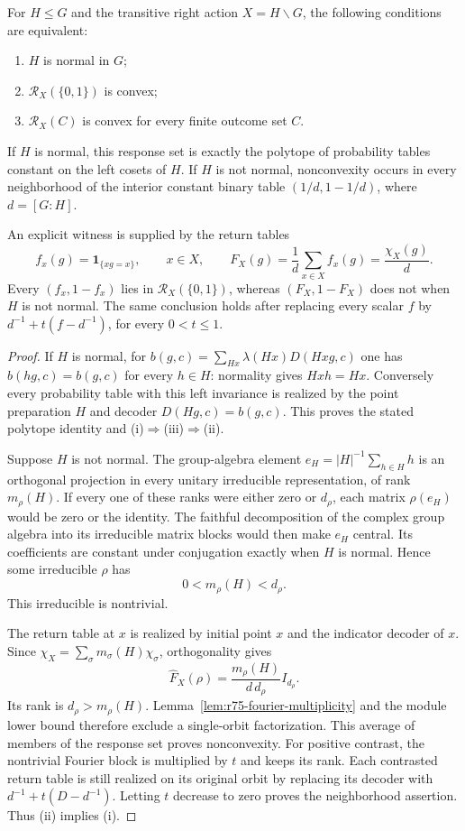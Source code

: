 \begin{theorem}
\label{thm:r75-normality-convexity}
For $H\le G$ and the transitive right action $X=H\backslash G$, the
following conditions are equivalent:
\begin{enumerate}
\item $H$ is normal in $G$;
\item $\mathcal R_X(\{0,1\})$ is convex;
\item $\mathcal R_X(C)$ is convex for every finite outcome set $C$.
\end{enumerate}
If $H$ is normal, this response set is exactly the polytope of
probability tables constant on the left cosets of $H$. If $H$ is not
normal, nonconvexity occurs in every neighborhood of the interior
constant binary table $(1/d,1-1/d)$, where $d=[G:H]$.

An explicit witness is supplied by the return tables
\[
 f_x(g)=\mathbf1_{\{xg=x\}},\qquad x\in X,
 \qquad
 F_X(g)=\frac1d\sum_{x\in X}f_x(g)=\frac{\chi_X(g)}d.
\]
Every $(f_x,1-f_x)$ lies in $\mathcal R_X(\{0,1\})$, whereas
$(F_X,1-F_X)$ does not when $H$ is not normal. The same conclusion
holds after replacing every scalar $f$ by $d^{-1}+t(f-d^{-1})$, for
every $0<t\le1$.
\end{theorem}
\begin{proof}
If $H$ is normal, for
$b(g,c)=\sum_{Hx}\lambda(Hx)D(Hxg,c)$ one has
$b(hg,c)=b(g,c)$ for every $h\in H$: normality gives $Hxh=Hx$.
Conversely every probability table with this left invariance is
realized by the point preparation $H$ and decoder
$D(Hg,c)=b(g,c)$. This proves the stated polytope identity and
(i)$\Rightarrow$(iii)$\Rightarrow$(ii).

Suppose $H$ is not normal. The group-algebra element
$e_H=|H|^{-1}\sum_{h\in H}h$ is an orthogonal projection in every
unitary irreducible representation, of rank $m_\rho(H)$. If every one
of these ranks were either zero or $d_\rho$, each matrix $\rho(e_H)$
would be zero or the identity. The faithful decomposition of the
complex group algebra into its irreducible matrix blocks would then
make $e_H$ central. Its coefficients are constant under conjugation
exactly when $H$ is normal. Hence some irreducible $\rho$ has
\[
 0<m_\rho(H)<d_\rho.
\]
This irreducible is nontrivial.

The return table at $x$ is realized by initial point $x$ and the
indicator decoder of $x$. Since
$\chi_X=\sum_\sigma m_\sigma(H)\chi_\sigma$, orthogonality gives
\[
 \widehat F_X(\rho)=\frac{m_\rho(H)}{d\,d_\rho}I_{d_\rho}.
\]
Its rank is $d_\rho>m_\rho(H)$. Lemma~\ref{lem:r75-fourier-multiplicity}
and the module lower bound therefore exclude a single-orbit
factorization. This average of members of the response set proves
nonconvexity. For positive contrast, the nontrivial Fourier block is
multiplied by $t$ and keeps its rank. Each contrasted return table is
still realized on its original orbit by replacing its decoder with
$d^{-1}+t(D-d^{-1})$. Letting $t$ decrease to zero proves the
neighborhood assertion. Thus (ii) implies (i).
\end{proof}

